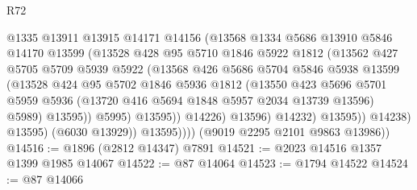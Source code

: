 \begin{lexlean}{R72}
\begin{coremodule}
                              @1335
                              @13911
                              @13915
                              @14171
                              @14156
                              (@13568
                                @1334
                                @5686
                                @13910
                                @5846
                                @14170
                                @13599
                                (@13528
                                  @428
                                  @95
                                  @5710
                                  @1846
                                  @5922
                                  @1812
                                  (@13562
                                    @427
                                    @5705
                                    @5709
                                    @5939
                                    @5922
                                    (@13568
                                      @426
                                      @5686
                                      @5704
                                      @5846
                                      @5938
                                      @13599
                                      (@13528
                                        @424
                                        @95
                                        @5702
                                        @1846
                                        @5936
                                        @1812
                                        (@13550
                                          @423
                                          @5696
                                          @5701
                                          @5959
                                          @5936
                                          (@13720 @416 @5694 @1848 @5957 @2034 @13739 @13596)
                                          @5989)
                                        @13595))
                                    @5995)
                                  @13595))
                              @14226)
                            @13596)
                          @14232)
                        @13595))
                    @14238)
                  @13595)
                (@6030 @13929))
              @13595))))
      (@9019 @2295 @2101 @9863 @13986))
@14516 := @1896 (@2812 @14347) @7891
@14521 := @2023 @14516 @1357 @1399 @1985 @14067
@14522 := @87 @14064
@14523 := @1794 @14522
@14524 := @87 @14066

\end{coremodule}
\end{lexlean}

